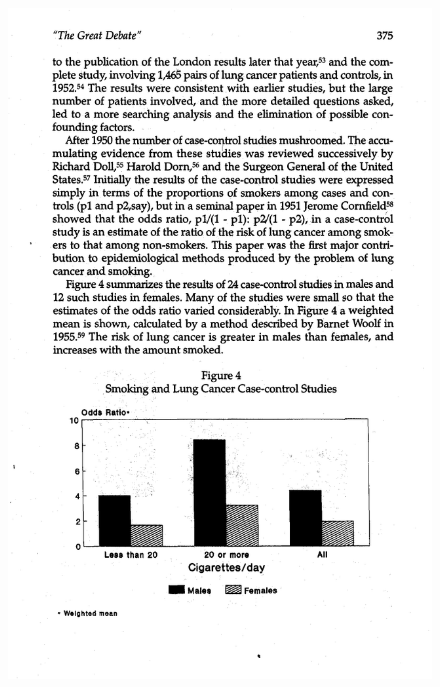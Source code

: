 \documentclass{beamer}
\begin{document}
\begin{frame}[plain]
	
	\begin{figure}
	\includegraphics[scale=0.5]{./lecture_includes/smoking_figure1.pdf}
	\end{figure}


\end{frame}
\end{document}
